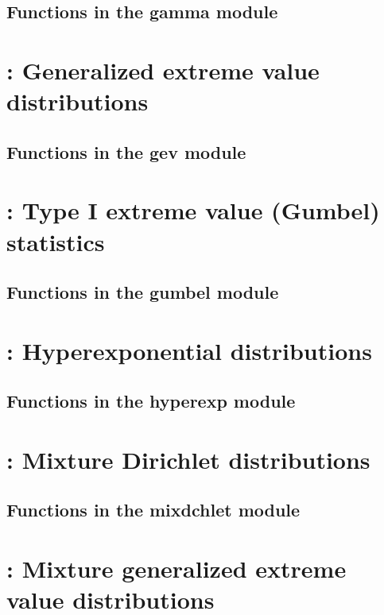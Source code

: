 \documentclass[10pt]{book}
\begin{document}
\subsection{Functions in the gamma module}


\newpage
\section{: Generalized extreme value distributions}

\subsection{Functions in the gev module}


\newpage
\section{: Type I extreme value (Gumbel) statistics}

\subsection{Functions in the gumbel module}


\newpage
\section{: Hyperexponential distributions}

\subsection{Functions in the hyperexp module}


\newpage
\section{: Mixture Dirichlet distributions}
%
\subsection{Functions in the mixdchlet module}
%

\newpage
\section{: Mixture generalized extreme value distributions}
%
\end{document}
